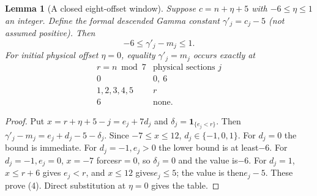\documentclass[11pt]{article}
\newtheorem{lemma}{Lemma}
\begin{document}
\begin{lemma}[A closed eight-offset window]\label{lem:window}
Suppose $c=n+\eta+5$ with $-6\le\eta\le1$ an integer.
Define the formal descended Gamma constant $\gamma'_j=c_j-5$
(not assumed positive). Then
\[
                     -6\le\gamma'_j-m_j\le1.             \tag{4}
\]
For initial physical offset $\eta=0$, equality $\gamma'_j=m_j$
occurs exactly at
\[
 \begin{array}{c|c}
 r=n\bmod7&\text{physical sections }j\\ \hline
 0&0,\ 6\\
 1,2,3,4,5&r\\
 6&\text{none}.
 \end{array}
\]
\end{lemma}
\begin{proof}
Put $x=r+\eta+5-j=e_j+7d_j$ and
$\delta_j=\boldsymbol1_{\{e_j<r\}}$.
Then $\gamma'_j-m_j=e_j+d_j-5-\delta_j$.
Since $-7\le x\le12$, $d_j\in\{-1,0,1\}$.
For $d_j=0$ the bound is immediate.
For $d_j=-1,e_j>0$ the lower bound is at least$-6$.
For $d_j=-1,e_j=0$, $x=-7$ forces$r=0$, so
$\delta_j=0$ and the value is$-6$.
For $d_j=1$, $x\le r+6$ gives $e_j<r$, and $x\le12$
gives$e_j\le5$; the value is then$e_j-5$.
These prove (4). Direct substitution at $\eta=0$ gives the table.
\end{proof}
\end{document}
